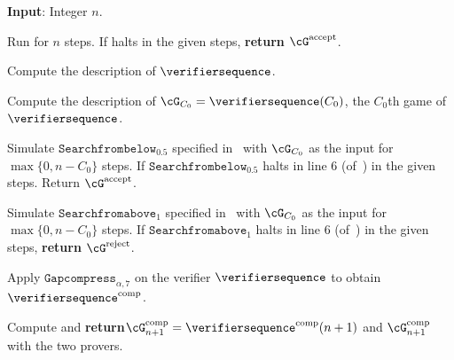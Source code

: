  \begin{algorithm}[H]
	\DontPrintSemicolon
	
	\textbf{Input}: Integer $n$. 
	
	Run \Turingmachinehalt for $n$ steps. If \Turingmachinehalt halts in the given steps, \textbf{return} $\cG^{\text{accept}}$.
	
	Compute the description of $\verifiersequence$.
	
	Compute the description of $\cG_{C_0} = \verifiersequence(C_0)$, the $C_0$th game of $\verifiersequence$.
	
	Simulate $\texttt{Searchfrombelow}_{0.5}$ specified in~ with $\cG_{C_0}$  as the input for $\max\{0, n - C_0\}$ steps. If $\texttt{Searchfrombelow}_{0.5}$ halts in line 6 (of~) in the given steps. Return $\cG^{\text{accept}}$. 
	
	Simulate $\texttt{Searchfromabove}_1$ specified in~ with $\cG_{C_0}$  as the input for $\max\{0, n - C_0\}$ steps. If $\texttt{Searchfromabove}_1$ halts in line 6 (of~) in the given steps, \textbf{return} $\cG^{\text{reject}}$. 
	
	Apply $\texttt{Gapcompress}_{\alpha, 7}$ on the verifier $\verifiersequence$ to obtain $\verifiersequence^{\text{comp}}$.
	
	Compute and \textbf{return}$\cG^{\text{comp}}_{n+1} = \verifiersequence^{\text{comp}}(n+1)$ and $\cG^{\text{comp}}_{n+1}$ with the two provers.
	
	\caption{An alternative game sequence for the proof of~. \Turingmachinehalt is the instance of the halting problem for the reduction.}
	\label{pseu:samevalueREcompletealt}
\end{algorithm}\DecMargin{1em}
\vspace{10pt}

